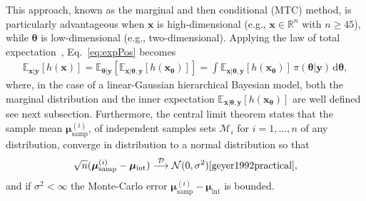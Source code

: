This approach, known as the marginal and then conditional (MTC) method, is particularly advantageous when $\bm{x}$ is high-dimensional (e.g., $\bm{x} \in \mathbb{R}^n$ with $n \geq 45$), while $\bm{\theta}$ is low-dimensional (e.g., two-dimensional).
Applying the law of total expectation~\cite{champ2022generalizedlawtotalcovariance}, Eq.~\eqref{eq:expPos} becomes
\begin{align}
	\mathbb{E}_{\bm{x} |  \bm{y}} [h(\bm{x})] 
	= \mathbb{E}_{\bm{\theta} |  \bm{y}} \left[ \mathbb{E}_{\bm{x} |  \bm{\theta}, \bm{y}} [h(\bm{x}_{\bm{\theta}})] \right] 
	= \int \mathbb{E}_{\bm{x} |  \bm{\theta}, \bm{y}} \left[ h(\bm{x}_{\bm{\theta}}) \right] \, \pi(\bm{\theta} |  \bm{y}) \, \mathrm{d}\bm{\theta},
	\label{eq:fullCond}
\end{align}
where, in the case of a linear-Gaussian hierarchical Bayesian model, both the marginal distribution and the inner expectation $\mathbb{E}_{\bm{x} |  \bm{\theta}, \bm{y}} \left[ h(\bm{x}_{\bm{\theta}}) \right]$ are well defined see next subsection.
Furthermore, the central limit theorem states that the sample mean $ \bm{\mu}^{(i)}_{\text{samp}} $, of independent samples sets $\mathcal{M}_i$ for $i = 1, \dots, n$ of any distribution, converge in distribution to a normal distribution so that
\begin{align}
	\sqrt{n} (\bm{\mu}^{(i)}_{\text{samp}} -  \bm{\mu}_{\text{int}} ) \overset{\mathcal{D}}{\longrightarrow} \mathcal{N} (0,\sigma^2) \text{\cite{geyer1992practical}},
\end{align}
and if $\sigma^2 < \infty$ the Monte-Carlo error $\bm{\mu}^{(i)}_{\text{samp}} -  \bm{\mu}_{\text{int}} $ is bounded.


